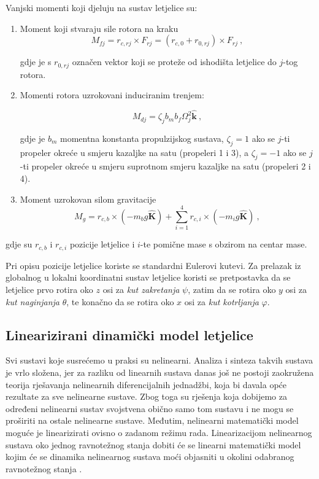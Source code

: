 \documentclass[11pt,a4paper]{article}
\begin{document}
\noindent Vanjski momenti koji djeluju na sustav letjelice su:
\begin{enumerate}
\item Moment koji stvaraju sile rotora na kraku
\begin{equation}
M_{fj} = r_{c,rj} \times F_{rj} = (r_{c,0} + r_{0,rj}) \times F_{rj} \ ,
\label{eq:Mfj}
\end{equation}

gdje je s $r_{0,rj}$ označen vektor koji se proteže od ishodišta letjelice do $j$-tog rotora.

\item Momenti rotora uzrokovani induciranim trenjem:

\begin{equation}
M_{dj} = \zeta_{j}b_{m}b_{f}\Omega_{j}^{2} \bm{\hat{k}} \ ,
\label{eq:Mdj}
\end{equation}

gdje je $b_{m}$ momentna konstanta propulzijskog sustava, $\zeta_{j} =  1$ ako se $j$-ti propeler okreće u smjeru kazaljke na satu (propeleri 1 i 3), a $\zeta_{j} =  -1$ ako se $j$-ti propeler okreće u smjeru suprotnom smjeru kazaljke na satu (propeleri 2 i 4).

\item Moment uzrokovan silom gravitacije
\begin{equation}
M_{g} = r_{c,b} \times (-m_{b}g \bm{\hat{K}}) + \sum_{i=1}^{4} r_{c,i}\times (-m_{i}g \bm{\hat{K}}) \ ,
\label{eq:Mg}
\end{equation}
\end{enumerate}

gdje su $r_{c,b}$ i $r_{c,i}$ pozicije letjelice i $i$-te pomične mase s obzirom na centar mase.

Pri opisu pozicije letjelice koriste se standardni Eulerovi kutevi. Za prelazak iz globalnog u lokalni koordinatni sustav letjelice koristi se pretpostavka da se letjelice prvo rotira oko $z$ osi za \textit{kut zakretanja} $\psi$, zatim da se rotira oko $y$ osi za \textit{kut naginjanja} $\theta$, te konačno da se rotira oko $x$ osi za \textit{kut kotrljanja} $\varphi$.



\subsection{Linearizirani dinamički model letjelice}

Svi sustavi koje susrećemo u praksi su nelinearni. Analiza i sinteza takvih sustava je vrlo složena, jer za razliku od linearnih sustava danas još ne postoji zaokružena teorija rješavanja nelinearnih diferencijalnih jednadžbi, koja bi davala opće rezultate za sve nelinearne sustave. Zbog toga su rješenja koja dobijemo za određeni nelinearni sustav svojstvena obično samo tom sustavu i ne mogu se proširiti na ostale nelinearne sustave. Međutim, nelinearni matematički model moguće je linearizirati ovisno o zadanom režimu rada. Linearizacijom nelinearnog sustava oko jednog ravnotežnog stanja dobiti će se linearni matematički model kojim će se dinamika nelinearnog sustava moći objasniti u okolini odabranog ravnotežnog stanja \cite{vukic}.
\end{document}
